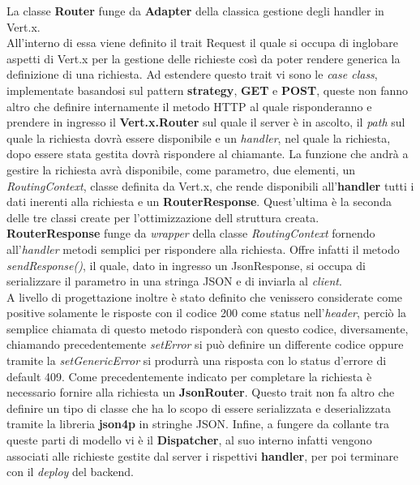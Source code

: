 	  La classe \textbf{Router} funge da \textbf{Adapter} della classica gestione degli handler in Vert.x.\\
	  All'interno di essa viene definito il trait Request il quale si occupa di inglobare aspetti di Vert.x per la gestione delle richieste così da poter rendere generica la definizione di una richiesta.
	  Ad estendere questo trait vi sono le \textit{case class}, implementate basandosi sul pattern \textbf{strategy}, \textbf{GET} e \textbf{POST}, queste non fanno altro che definire internamente il metodo HTTP al quale risponderanno e prendere in ingresso il \textbf{Vert.x.Router} sul quale il server è in ascolto, il \textit{path} sul quale la richiesta dovrà essere disponibile e un \textit{handler}, nel quale la richiesta, dopo essere stata gestita dovrà rispondere al chiamante.
	  La funzione che andrà a gestire la richiesta avrà disponibile, come parametro, due elementi, un \textit{RoutingContext}, classe definita da Vert.x, che rende disponibili all'\textbf{handler} tutti i dati inerenti alla richiesta e un \textbf{RouterResponse}.
	  Quest'ultima è la seconda delle tre classi create per l'ottimizzazione dell struttura creata. 
	  \\
	  \textbf{RouterResponse} funge da \textit{wrapper} della classe \textit{RoutingContext} fornendo all'\textit{handler} metodi semplici per rispondere alla richiesta. Offre infatti il metodo \textit{sendResponse()}, il quale, dato in ingresso un JsonResponse, si occupa di serializzare il parametro in una stringa JSON e di inviarla al \textit{client}. 
	  \\
	  A livello di progettazione inoltre è stato definito che venissero considerate come positive solamente le risposte con il codice 200 come status nell'\textit{header}, perciò la semplice chiamata di questo metodo risponderà con questo codice, diversamente, chiamando precedentemente \textit{setError} si può definire un differente codice oppure tramite la \textit{setGenericError} si produrrà una risposta con lo status d'errore di default 409.
	  Come precedentemente indicato per completare la richiesta è necessario fornire alla richiesta un \textbf{JsonRouter}. Questo trait non fa altro che definire un tipo di classe che ha lo scopo di essere serializzata e deserializzata tramite la libreria \textbf{json4p} in stringhe JSON.
	  Infine, a fungere da collante tra queste parti di modello vi è il \textbf{Dispatcher}, al suo interno infatti vengono associati alle richieste gestite dal server i rispettivi \textbf{handler}, per poi terminare con il \textit{deploy} del backend.
      
